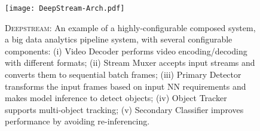





\begin{figure}[tp!]
    \centering
    \texttt{[image: DeepStream-Arch.pdf]}
    \caption{\small{\textsc{Deepstream}: An example of a highly-configurable composed system, a big data analytics pipeline system, with several configurable components: (i) Video Decoder performs video encoding/decoding with different formats; (ii) Stream Muxer accepts input streams and converts them to sequential batch frames; (iii) Primary Detector transforms the input frames based on input NN requirements and makes model inference to detect objects; (iv) Object Tracker supports multi-object tracking; (v) Secondary Classifier improves performance by avoiding re-inferencing.}}
    \label{fig:deepstream_pipeline}
    \vspace{-4mm}
\end{figure}


